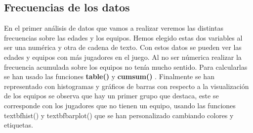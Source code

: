 \documentclass [a4paper] {article}
\begin{document}
\subsection{Frecuencias de los datos}
En el primer análisis de datos que vamos a realizar veremos las distintas frecuencias sobre las edades y los equipos. Hemos elegido
estas dos variables al ser una numérica y otra de cadena de texto. Con estos datos se pueden ver las edades y equipos con más jugadores en el juego.
Al no ser númerica realizar la frecuencia acumulada sobre los equipos no tenía mucho sentido. Para calcularlas se han usado las funciones 
\textbf{table()} y \textbf{cumsum()} .
Finalmente se han representado con histogramas y gráficos de barras con respecto a la visualización de los equipos se observa que hay un primer 
grupo que destaca, este 
se corresponde con los jugadores que no tienen un equipo, usando las funciones textbf{hist()} y textbf{barplot()} que se han 
personalizado cambiando colores y etiquetas.
\end{document}
